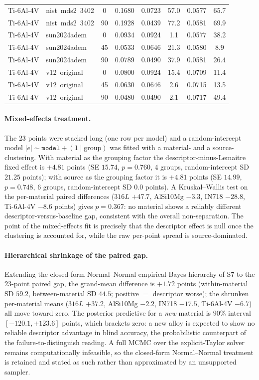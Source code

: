 \documentclass[12pt,a4paper,twocolumn]{article}
\begin{document}
\begin{table}[htbp]
{\begin{tabular}{llc c cc cc}
Ti-6Al-4V & nist~mds2~3402 & 0 & 0.1680 & 0.0723 & 57.0 & 0.0577 & 65.7 \\
Ti-6Al-4V & nist~mds2~3402 & 90 & 0.1928 & 0.0439 & 77.2 & 0.0581 & 69.9 \\
Ti-6Al-4V & sun2024adem & 0 & 0.0934 & 0.0924 & 1.1 & 0.0577 & 38.2 \\
Ti-6Al-4V & sun2024adem & 45 & 0.0533 & 0.0646 & 21.3 & 0.0580 & 8.9 \\
Ti-6Al-4V & sun2024adem & 90 & 0.0789 & 0.0490 & 37.9 & 0.0581 & 26.4 \\
Ti-6Al-4V & v12~original & 0 & 0.0800 & 0.0924 & 15.4 & 0.0709 & 11.4 \\
Ti-6Al-4V & v12~original & 45 & 0.0630 & 0.0646 & 2.6 & 0.0715 & 13.5 \\
Ti-6Al-4V & v12~original & 90 & 0.0480 & 0.0490 & 2.1 & 0.0717 & 49.4 \\
\bottomrule
\end{tabular}%
}
\end{table}

\paragraph{Mixed-effects treatment.}
The $23$ points were stacked long (one row per model) and a random-intercept model
$\lvert e \rvert \sim \texttt{model} + (1\mid\text{group})$ was fitted with a material- and a source-clustering.
With material as the grouping factor the descriptor-minus-Lemaitre fixed effect is $+4.81$ points
(SE $15.74$, $p = 0.760$, $4$ groups, random-intercept SD $21.25$ points); with source as the grouping factor it is
$+4.81$ points (SE $14.99$, $p = 0.748$, $6$ groups, random-intercept SD $0.0$ points). A Kruskal--Wallis test on
the per-material paired differences ($316L$ $+47.7$, AlSi10Mg $-3.3$, IN718 $-28.8$, Ti-6Al-4V $-8.6$ points)
gives $p = 0.367$: no material shows a reliably different descriptor-versus-baseline gap, consistent with the
overall non-separation. The point of the mixed-effects fit is precisely that the descriptor effect is null once
the clustering is accounted for, while the raw per-point spread is source-dominated.

\paragraph{Hierarchical shrinkage of the paired gap.}
Extending the closed-form Normal--Normal empirical-Bayes hierarchy of S7 to the $23$-point paired gap, the
grand-mean difference is $+1.72$ points (within-material SD $59.2$, between-material SD $44.5$; positive $=$
descriptor worse); the shrunken per-material means ($316L$ $+37.2$, AlSi10Mg $-2.2$, IN718 $-17.5$, Ti-6Al-4V
$-6.7$) all move toward zero. The posterior predictive for a \emph{new} material is $90\%$ interval
$[-120.1, +123.6]$ points, which brackets zero: a
new alloy is expected to show no reliable descriptor advantage in blind accuracy, the probabilistic counterpart
of the failure-to-distinguish reading. A full MCMC over the explicit-Taylor solver remains computationally
infeasible, so the closed-form Normal--Normal treatment is retained and stated as such rather than approximated
by an unsupported sampler.
\end{document}
